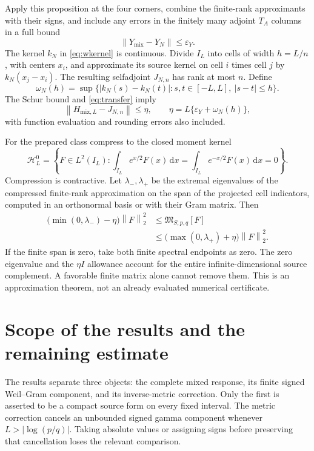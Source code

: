 \documentclass[11pt]{article}
\theoremstyle{remark}
\newcommand{\HH}{\mathcal H}
\newcommand{\Mix}{\mathfrak M_{S;p,q}}
\newcommand{\norm}[1]{\left\lVert#1\right\rVert}
\newcommand{\dd}{\,\mathrm d}
\numberwithin{equation}{section}
\begin{document}
Apply this proposition at the four corners, combine the finite-rank
approximants with their signs, and include any errors in the finitely
many adjoint \(T_A\) columns in a full bound
\begin{equation}\label{eq:Yerror}
 \norm{Y_{\mathrm{mix}}-Y_N}\le\varepsilon_Y .
\end{equation}
The kernel \(k_N\) in \eqref{eq:wkernel} is continuous. Divide \(I_L\)
into cells of width \(h=L/n\), with centers \(x_i\), and approximate its
source kernel on cell \(i\) times cell \(j\) by \(k_N(x_j-x_i)\).
The resulting selfadjoint \(J_{N,n}\) has rank at most \(n\). Define
\[
 \omega_N(h)=\sup\{|k_N(s)-k_N(t)|:
            s,t\in[-L,L],\ |s-t|\le h\}.
\]
The Schur bound and \eqref{eq:transfer} imply
\begin{equation}\label{eq:eta}
 \norm{H_{\mathrm{mix},L}-J_{N,n}}\le\eta,\qquad
 \eta=L\{\varepsilon_Y+\omega_N(h)\},
\end{equation}
with function evaluation and rounding errors also included.

For the prepared class compress to the closed moment kernel
\[
 \HH_L^0=\left\{F\in L^2(I_L):
       \int_{I_L}e^{x/2}F(x)\dd x
       =\int_{I_L}e^{-x/2}F(x)\dd x=0\right\}.
\]
Compression is contractive. Let \(\lambda_-,\lambda_+\) be the extremal
eigenvalues of the compressed finite-rank approximation on the span of
the projected cell indicators, computed in an orthonormal basis or with
their Gram matrix. Then
\begin{equation}\label{eq:signed}
 \boxed{
 \begin{aligned}
  \bigl(\min(0,\lambda_-)-\eta\bigr)\norm F_2^2
       &\le\Mix[F]\\
       &\le\bigl(\max(0,\lambda_+)+\eta\bigr)\norm F_2^2 .
 \end{aligned}}
\end{equation}
If the finite span is zero, take both finite spectral endpoints as zero.
The zero eigenvalue and the \(\eta I\) allowance account for the entire
infinite-dimensional source complement. A favorable finite matrix
alone cannot remove them. This is an approximation theorem, not an
already evaluated numerical certificate.

\section{Scope of the results and the remaining estimate}\label{sec:scope}

The results separate three objects: the complete mixed response, its
finite signed Weil--Gram component, and its inverse-metric correction.
Only the first is asserted to be a compact source form on every fixed
interval. The metric correction cancels an unbounded signed gamma
component whenever \(L>|\log(p/q)|\). Taking absolute values or assigning
signs before preserving that cancellation loses the relevant comparison.
\end{document}
